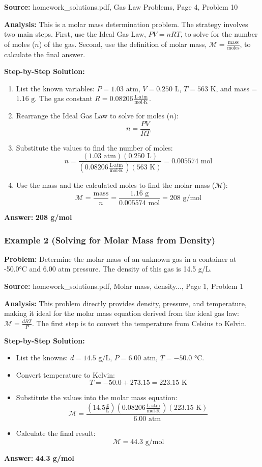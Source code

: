 \documentclass{article}
\begin{document}
\textbf{Source:} homework\_solutions.pdf, Gas Law Problems, Page 4, Problem 10

\textbf{Analysis:} This is a molar mass determination problem. The strategy involves two main steps. First, use the Ideal Gas Law, $PV=nRT$, to solve for the number of moles ($n$) of the gas. Second, use the definition of molar mass, $\mathcal{M} = \frac{\text{mass}}{\text{moles}}$, to calculate the final answer.

\textbf{Step-by-Step Solution:}
\begin{enumerate}
    \item List the known variables: $P = 1.03 \text{ atm}$, $V = 0.250 \text{ L}$, $T = 563 \text{ K}$, and mass = $1.16 \text{ g}$. The gas constant $R = 0.08206 \frac{\text{L} \cdot \text{atm}}{\text{mol} \cdot \text{K}}$.
    \item Rearrange the Ideal Gas Law to solve for moles ($n$):
    \[ n = \frac{PV}{RT} \]
    \item Substitute the values to find the number of moles:
    \[ n = \frac{(1.03 \text{ atm})(0.250 \text{ L})}{(0.08206 \frac{\text{L} \cdot \text{atm}}{\text{mol} \cdot \text{K}})(563 \text{ K})} = 0.005574 \text{ mol} \]
    \item Use the mass and the calculated moles to find the molar mass ($\mathcal{M}$):
    \[ \mathcal{M} = \frac{\text{mass}}{n} = \frac{1.16 \text{ g}}{0.005574 \text{ mol}} = 208 \text{ g/mol} \]
\end{enumerate}
\textbf{Answer:} \textbf{208 g/mol}

\subsubsection{Example 2 (Solving for Molar Mass from Density)}
\textbf{Problem:} Determine the molar mass of an unknown gas in a container at -50.0°C and 6.00 atm pressure. The density of this gas is 14.5 g/L.

\textbf{Source:} homework\_solutions.pdf, Molar mass, density..., Page 1, Problem 1

\textbf{Analysis:} This problem directly provides density, pressure, and temperature, making it ideal for the molar mass equation derived from the ideal gas law: $\mathcal{M} = \frac{dRT}{P}$. The first step is to convert the temperature from Celsius to Kelvin.

\textbf{Step-by-Step Solution:}
\begin{itemize}
    \item List the knowns: $d = 14.5 \text{ g/L}$, $P = 6.00 \text{ atm}$, $T = -50.0 \text{ °C}$.
    \item Convert temperature to Kelvin:
    \[ T = -50.0 + 273.15 = 223.15 \text{ K} \]
    \item Substitute the values into the molar mass equation:
    \[ \mathcal{M} = \frac{(14.5 \frac{\text{g}}{\text{L}})(0.08206 \frac{\text{L} \cdot \text{atm}}{\text{mol} \cdot \text{K}})(223.15 \text{ K})}{6.00 \text{ atm}} \]
    \item Calculate the final result:
    \[ \mathcal{M} = 44.3 \text{ g/mol} \]
\end{itemize}
\textbf{Answer:} \textbf{44.3 g/mol}
\end{document}
